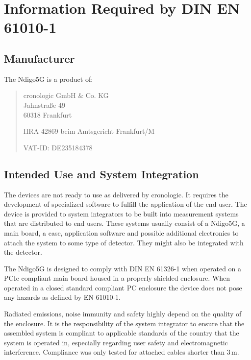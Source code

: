 \section{Information Required by DIN EN 61010-1}
\subsection{Manufacturer\label{cp:manu}}

The Ndigo5G is a product of:\

\begin{quote}
    cronologic GmbH \& Co. KG\\
    Jahnstra\ss{}e 49\\
    60318 Frankfurt\par
    \noindent HRA 42869 beim Amtsgericht Frankfurt/M\par
    \noindent VAT-ID: DE235184378
\end{quote}

\subsection{Intended Use and System Integration}

    The devices are not ready to use as delivered by cronologic. It requires the development of specialized software to fulfill the application of the end user. The device is provided to system integrators to be built into measurement systems that are distributed to end users. These systems usually consist of a Ndigo5G, a main board, a case, application software and possible additional electronics to attach the system to some type of detector. They might also be integrated with the detector.\par

    The Ndigo5G is designed to comply with DIN EN 61326-1 when operated on a PCIe compliant main board housed in a properly shielded enclosure. When operated in a closed standard compliant PC enclosure the device does not pose any hazards as defined by EN 61010-1.\par

    Radiated emissions, noise immunity and safety highly depend on the quality of the enclosure. It is the responsibility of the system integrator to ensure that the assembled system is compliant to applicable standards of the country that the system is operated in, especially regarding user safety and electromagnetic interference. Compliance was only tested for attached cables shorter than 3\,m.\par

